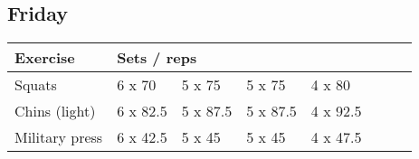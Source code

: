 \documentclass[12pt, a4paper]{article}%
\begin{document}
  \subsection*{\hspace{0.5em} Friday }


  \begin{tabular}{l|lllllll}
  \hspace{0.75em} \textbf{Exercise} & \multicolumn{ 7 }{l}{ \textbf{Sets / reps} } \\ \hline

            \hspace{0.75em} Squats
            & 6 x 70
            & 5 x 75
            & 5 x 75
            & 4 x 80
            & 
            & 
            & 
            \\


            \hspace{0.75em} Chins (light)
            & 6 x 82.5
            & 5 x 87.5
            & 5 x 87.5
            & 4 x 92.5
            & 
            & 
            & 
            \\


            \hspace{0.75em} Military press
            & 6 x 42.5
            & 5 x 45
            & 5 x 45
            & 4 x 47.5
            & 
            & 
            & 
            \\


  \end{tabular}
\end{document}
